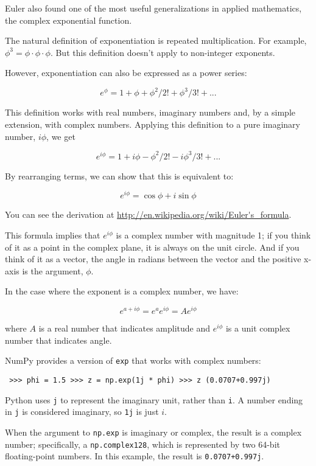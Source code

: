 \documentclass[12pt]{book} \usepackage[width=5.5in,height=8.5in, hmarginratio=3:2,vmarginratio=1:1]{geometry}
\begin{document}
Euler also found one of the most useful generalizations in applied mathematics, the complex exponential function. 

The natural definition of exponentiation is repeated multiplication. For example, $\phi^3 = \phi \cdot \phi \cdot \phi$. But this definition doesn't apply to non-integer exponents. 

However, exponentiation can also be expressed as a power series: 

%
\[ e^\phi = 1 + \phi + \phi^2/2! + \phi^3/3! + ... \] 

%
This definition works with real numbers, imaginary numbers and, by a simple extension, with complex numbers. Applying this definition to a pure imaginary number, $i\phi$, we get 

%
\[ e^{i\phi} = 1 + i\phi - \phi^2/2! - i\phi^3/3! + ... \] 

%
By rearranging terms, we can show that this is equivalent to: 

%
\[ e^{i\phi} = \cos \phi + i \sin \phi \] 

%
You can see the derivation at \url{http://en.wikipedia.org/wiki/Euler's_formula}. 

This formula implies that $e^{i\phi}$ is a complex number with magnitude 1; if you think of it as a point in the complex plane, it is always on the unit circle. And if you think of it as a vector, the angle in radians between the vector and the positive x-axis is the argument, $\phi$. 

In the case where the exponent is a complex number, we have: 

%
\[ e^{a + i\phi} = e^a e^{i\phi} = A e^{i\phi} \] 

%
where $A$ is a real number that indicates amplitude and $e^{i\phi}$ is a unit complex number that indicates angle. 

NumPy provides a version of {\tt exp} that works with complex numbers: 

\begin{verbatim} >>> phi = 1.5 >>> z = np.exp(1j * phi) >>> z (0.0707+0.997j) \end{verbatim} 

Python uses {\tt j} to represent the imaginary unit, rather than {\tt i}. A number ending in {\tt j} is considered imaginary, so {\tt 1j} is just $i$. 

When the argument to {\tt np.exp} is imaginary or complex, the result is a complex number; specifically, a {\tt np.complex128}, which is represented by two 64-bit floating-point numbers. In this example, the result is {\tt 0.0707+0.997j}. 
\end{document}
